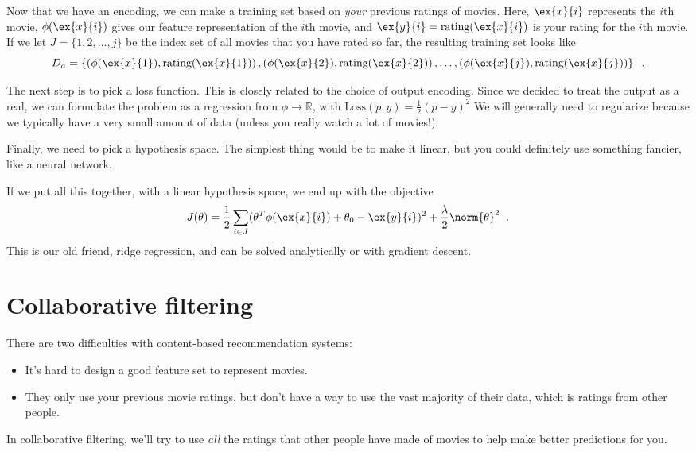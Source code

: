 Now that we have an encoding, we can make a 
training set based on {\em your} previous ratings of movies. Here,
$\ex{x}{i}$ represents the $i$th movie, $\phi(\ex{x}{i})$ gives our 
feature representation of the $i$th movie, and $\ex{y}{i} = \text{rating}(\ex{x}{i})$
is your rating for the $i$th movie. If we let $J = \{1,2, \ldots, j\}$ be the index set of all movies that you have rated so far,
the resulting training set looks like
    \[ D_a = \left\{
        \left(\phi(\ex{x}{1}), \text{rating}(\ex{x}{1})\right),
        \left(\phi(\ex{x}{2}), \text{rating}(\ex{x}{2})\right),
        \ldots,
	\left(\phi(\ex{x}{j}), \text{rating}(\ex{x}{j})\right)
      \right\}\;\;.\]

The next step is to pick a loss function.  This is closely related to
the choice of output encoding.  Since we decided to treat the output
as a real, we can formulate the problem as a  regression from $\phi
\rightarrow \mathbb{R}$, with $\text{Loss}(p, y) = \frac{1}{2}(p-y)^2$
We will generally need to regularize because we typically have a very
small amount of data (unless you really watch a lot of movies!).  

Finally, we need to pick a hypothesis space.  The simplest thing would
be to make it linear, but you could definitely use something fancier,
like a neural network.  

If we put all this together,  with  a linear hypothesis space, we end
up with the objective
    \[J(\theta) = \frac{1}{2}\sum_{i \in J}
      (\theta^T \phi( \ex{x}{i} ) + \theta_0 - \ex{y}{i})^2
      + \frac{\lambda}{2} \norm{\theta}^2\;\;.\]
      This is our old friend, ridge regression, and can be solved
      analytically or with gradient descent.

\section{Collaborative filtering}
There are two difficulties with content-based recommendation systems:
\begin{itemize}
\item It's hard to design a good feature set to represent movies.
\item They only use your previous movie ratings, but don't have a way
  to use the vast majority of their data, which is ratings from other
  people. 
\end{itemize}
In collaborative filtering, we'll try to use {\em all} the ratings
that other people have made of movies to help make
better predictions for you.  

